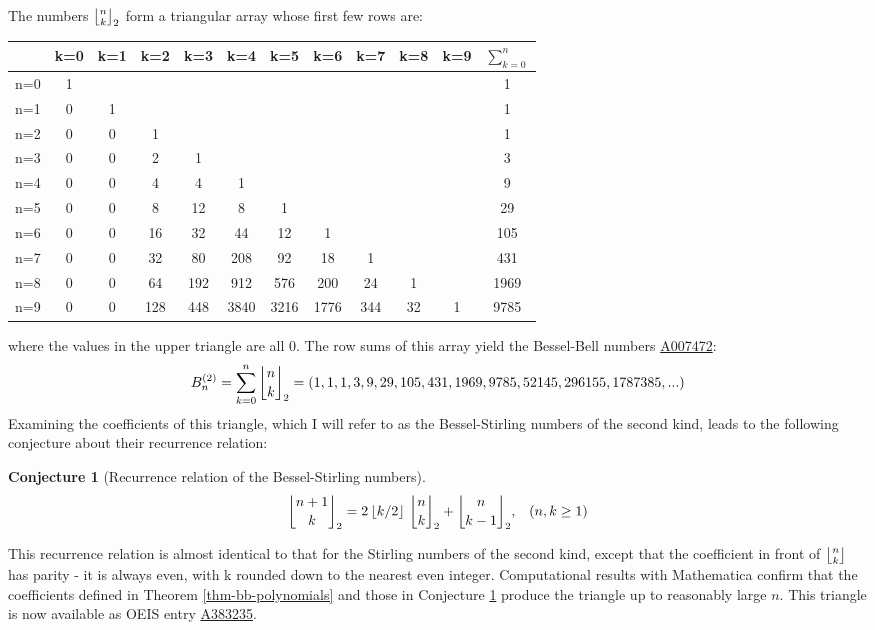 \documentclass[a4paper]{amsart}
\newcommand{\mStirling}[0]{\genfrac{\lfloor}{\rfloor}{0pt}{}}
\newcommand{\floor}[1]{\left\lfloor #1 \right\rfloor}
\newtheorem{conjecture}[theorem]{Conjecture}
\begin{document}
The numbers $\mStirling{n}{k}_2$ form a triangular array whose first few rows are:
\begin{center}
\begin{tabular}{|l|*{10}{c}|c|}
\hline
      & k=0 & k=1 & k=2 & k=3 & k=4 & k=5 & k=6 & k=7 & k=8 & k=9 & $\sum_{k=0}^{n}$ \\
\hline
n=0 & 1   &     &     &     &     &     &     &     &     &     & 1                \\
n=1 & 0   & 1   &     &     &     &     &     &     &     &     & 1                \\
n=2 & 0   & 0   & 1   &     &     &     &     &     &     &     & 1                \\
n=3 & 0   & 0   & 2   & 1   &     &     &     &     &     &     & 3                \\
n=4 & 0   & 0   & 4   & 4   & 1   &     &     &     &     &     & 9                \\
n=5 & 0   & 0   & 8   & 12  & 8   & 1   &     &     &     &     & 29               \\
n=6 & 0   & 0   & 16  & 32  & 44  & 12  & 1   &     &     &     & 105              \\
n=7 & 0   & 0   & 32  & 80  & 208 & 92  & 18  & 1   &     &     & 431              \\
n=8 & 0   & 0   & 64  & 192 & 912 & 576 & 200 & 24  & 1   &     & 1969             \\
n=9 & 0   & 0   & 128 & 448 & 3840& 3216& 1776& 344 & 32  & 1   & 9785             \\
\hline
\end{tabular}
\smallskip
\end{center}
where the values in the upper triangle are all 0. The row sums of this array yield the Bessel-Bell numbers \href{https://oeis.org/A007472}{A007472}:
\[
B_n^{(2)} = \sum_{k=0}^{n}\genfrac{\lfloor}{\rfloor}{0pt}{}{n}{k}_2 = (1, 1, 1, 3, 9, 29, 105, 431, 1969, 9785, 52145, 296155, 1787385, ...)
\]
Examining the coefficients of this triangle, which I will refer to as the Bessel-Stirling numbers of the second kind, leads to the following conjecture about their recurrence relation:
\begin{conjecture}[Recurrence relation of the Bessel-Stirling numbers]\label{conj-bs-recurrence}
\[
\mStirling{n+1}{k}_2 = 2\floor{k/2} \, \mStirling{n}{k}_2 + \mStirling{n}{k-1}_2, \,\,\,\,\, (n, k \ge 1)\\
\]    
\end{conjecture}
This recurrence relation is almost identical to that for the Stirling numbers of the second kind, except that the coefficient in front of $\mStirling{n}{k}$ has parity - it is always even, with k rounded down to the nearest even integer. Computational results with Mathematica confirm that the coefficients defined in Theorem \ref{thm-bb-polynomials} and those in Conjecture \ref{conj-bs-recurrence} produce the triangle up to reasonably large $n$. This triangle is now available as OEIS entry \href{https://oeis.org/A383235}{A383235}.
\end{document}
